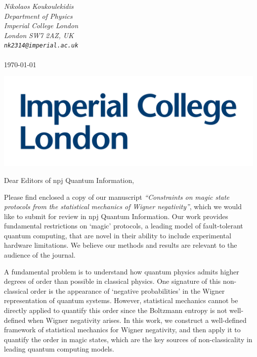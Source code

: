 \documentclass[11pt]{letter}
\begin{document}
\hfill\begin{minipage}{6cm}
	\raggedright
	\vspace{-2.5cm}
	{\footnotesize\itshape Nikolaos Koukoulekidis}\\
	{\footnotesize\itshape Department of Physics}\\
	{\footnotesize\itshape Imperial College London}\\
	{\footnotesize\itshape London SW7 2AZ, UK}\\
	{\footnotesize\itshape %
		\verb|nk2314@imperial.ac.uk|}\\
	~\\
		\footnotesize\today
\end{minipage}

\vspace{-3.5cm}
\includegraphics[scale=.1]{icllogo.png}
\vspace{3.5cm}

\vspace{-1.5cm}
Dear Editors of npj Quantum Information,

\vspace{.3cm}
	
Please find enclosed a copy of our manuscript \emph{``Constraints on magic state protocols from the statistical mechanics of Wigner negativity''}, which we would like to submit for review in npj Quantum Information. 
Our work provides fundamental restrictions on `magic' protocols, a leading model of fault-tolerant quantum computing, that are novel in their ability to include experimental hardware limitations. We believe our methods and results are relevant to the audience of the journal.

A fundamental problem is to understand how quantum physics admits higher degrees of order than possible in classical physics. One signature of this non-classical order is the appearance of `negative probabilities' in the Wigner representation of quantum systems. However, statistical mechanics cannot be directly applied to quantify this order since the Boltzmann entropy is not well-defined when Wigner negativity arises. In this work, we construct a well-defined framework of statistical mechanics for Wigner negativity, and then apply it to quantify the order in magic states, which are the key sources of non-classicality in leading quantum computing models.
\end{document}
